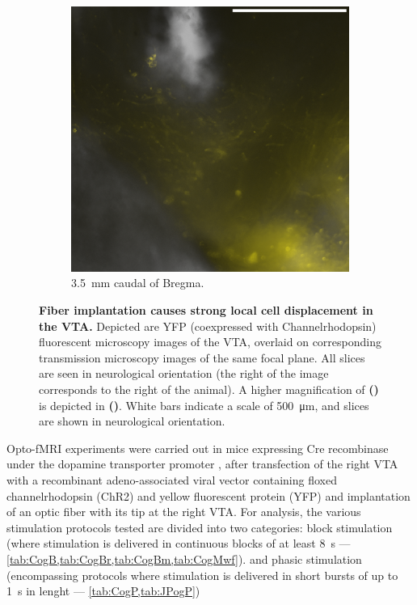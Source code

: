 \begin{figure}[h!]
\begin{subfigure}{.43\textwidth}
		\label{fig:h6589}
	\end{subfigure}
	\begin{subfigure}{.2728\textwidth}
		\centering
		\includegraphics[width=\textwidth]{img/sub-6589_slice-a4_zoom-10_scene-2_transmission-yfp-comb_straight.png}
                \caption{\SI{3.5}{\milli\meter} caudal of Bregma.}
		\label{fig:h6589z}
	\end{subfigure}
        \vspace{-.5em}
	\caption{
		\textbf{Fiber implantation causes strong local cell displacement in the VTA.}
                Depicted are YFP (coexpressed with Channelrhodopsin) fluorescent microscopy images of the VTA, overlaid on corresponding transmission microscopy images of the same focal plane.
                All slices are seen in neurological orientation (the right of the image corresponds to the right of the animal).
                A higher magnification of \textbf{()} is depicted in \textbf{()}.
                White bars indicate a scale of \SI{500}{\micro\meter}, and slices are shown in neurological orientation.
                }
	\label{fig:h}
\end{figure}

Opto-fMRI experiments were carried out in mice expressing Cre recombinase under the dopamine transporter promoter \cite{dat}, after transfection of the right VTA with a recombinant adeno-associated viral vector containing floxed channelrhodopsin (ChR2) and yellow fluorescent protein (YFP) and implantation of an optic fiber with its tip at the right VTA.
For analysis, the various stimulation protocols tested are divided into two categories:
block stimulation (where stimulation is delivered in continuous blocks of at least \SI{8}{\second} --- \cref{tab:CogB,tab:CogBr,tab:CogBm,tab:CogMwf}).
and
phasic stimulation (encompassing protocols where stimulation is delivered in short bursts of up to \SI{1}{\second} in lenght --- \cref{tab:CogP,tab:JPogP})

